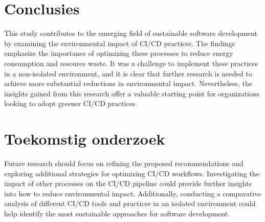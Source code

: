 \documentclass[a0,portrait]{hogent-poster}
\begin{document}
\begin{multicols}{2}

\section{Conclusies}
This study contributes to the emerging field of sustainable software development by examining the environmental impact of CI/CD practices. The findings emphasize the importance of optimizing these processes to reduce energy consumption and resource waste. It was a challenge to implement these practices in a non-isolated environment, and it is clear that further research is needed to achieve more substantial reductions in environmental impact. Nevertheless, the insights gained from this research offer a valuable starting point for organizations looking to adopt greener CI/CD practices.

\section{Toekomstig onderzoek}
Future research should focus on refining the proposed recommendations and exploring additional strategies for optimizing CI/CD workflows. Investigating the impact of other processes on the CI/CD pipeline could provide further insights into how to reduce environmental impact. Additionally, conducting a comparative analysis of different CI/CD tools and practices in an isolated environment could help identify the most sustainable approaches for software development.


\end{multicols}
\end{document}
